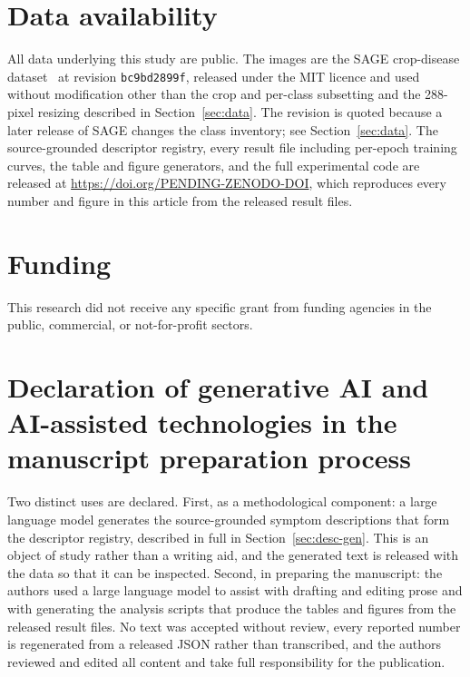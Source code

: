 \documentclass[a4paper,fleqn]{cas-dc}
\begin{document}
\section*{Data availability}
All data underlying this study are public. The images are the SAGE crop-disease
dataset~\citep{sagedata2026} at revision \texttt{bc9bd2899f}, released under the MIT licence and
used without modification other than the crop and per-class subsetting and the 288-pixel resizing
described in Section~\ref{sec:data}. The revision is quoted because a later release of SAGE changes
the class inventory; see Section~\ref{sec:data}. The source-grounded
descriptor registry, every result file including per-epoch training curves, the table and figure
generators, and the full experimental code are released at \url{https://doi.org/PENDING-ZENODO-DOI},
which reproduces every number and figure in this article from the released result files.

\section*{Funding}
This research did not receive any specific grant from funding agencies in the public, commercial, or
not-for-profit sectors.

\section*{Declaration of generative AI and AI-assisted technologies in the
manuscript preparation process}
Two distinct uses are declared. First, as a methodological component: a large language
model generates the source-grounded symptom descriptions that form the descriptor
registry, described in full in Section~\ref{sec:desc-gen}. This is an object of study
rather than a writing aid, and the generated text is released with the data so that it can
be inspected. Second, in preparing the manuscript: the authors used a large language model
to assist with drafting and editing prose and with generating the analysis scripts that
produce the tables and figures from the released result files. No text was accepted without
review, every reported number is regenerated from a released JSON rather than transcribed,
and the authors reviewed and edited all content and take full responsibility for the
publication.



\end{document}
